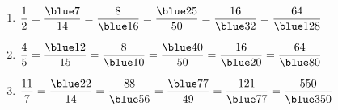    \ \\ [-5mm]
   \begin{enumerate}
      \item $\dfrac{1}{2} =\dfrac{\blue 7}{14} =\dfrac{8}{\blue 16} =\dfrac{\blue 25}{50} =\dfrac{16}{\blue 32} =\dfrac{64}{\blue 128}$ \\ [2mm]
      \item $\dfrac{4}{5} =\dfrac{\blue 12}{15} =\dfrac{8}{\blue 10} =\dfrac{\blue 40}{50} =\dfrac{16}{\blue 20} =\dfrac{64}{\blue 80}$ \\ [2mm]
      \item $\dfrac{11}{7} =\dfrac{\blue 22}{14} =\dfrac{88}{\blue 56} =\dfrac{\blue 77}{49} =\dfrac{121}{\blue 77} =\dfrac{550}{\blue 350}$
   \end{enumerate}
